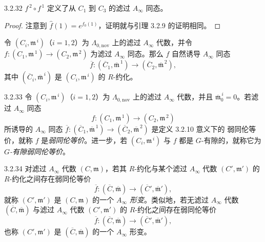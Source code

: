 \begin{lemma}{3.2.32}\label{lem:3-2-32}
$f^{\,2}\circ f^{\,1}$ 定义了从 $C_1$ 到 $C_3$ 的滤过
$A_\infty$ 同态。
\end{lemma}

\begin{proof}
注意到 $\widehat f(1)=e^{f_0(1)}$，证明就与引理 3.2.9 的证明相同。
\end{proof}

令 $(C_i,\mathfrak m^{\,i})$（$i=1,2$）为
$\Lambda_{0,\mathrm{nov}}$ 上的滤过 $A_\infty$ 代数，并令
$f\colon(C_1,\mathfrak m^{\,1})\to(C_2,\mathfrak m^{\,2})$ 为滤过
$A_\infty$ 同态。那么 $f$ 自然诱导 $A_\infty$ 同态
\[
  \overline f\colon
  (\overline C_1,\overline{\mathfrak m}^{\,1})
  \longrightarrow
  (\overline C_2,\overline{\mathfrak m}^{\,2}),
\]
其中 $(\overline C_i,\overline{\mathfrak m}^{\,i})$ 是
$(C_i,\mathfrak m^{\,i})$ 的 $R$-约化。

\begin{definition}{3.2.33}\label{def:3-2-33}
令 $(C_i,\mathfrak m^{\,i})$（$i=1,2$）为
$\Lambda_{0,\mathrm{nov}}$ 上的滤过 $A_\infty$ 代数，并且
$\overline{\mathfrak m}^{\,i}_0=0$。若滤过 $A_\infty$ 同态
\[
  f\colon(C_1,\mathfrak m^{\,1})
  \longrightarrow(C_2,\mathfrak m^{\,2})
\]
所诱导的 $A_\infty$ 同态
$\overline f\colon(\overline C_1,\overline{\mathfrak m}^{\,1})
\to(\overline C_2,\overline{\mathfrak m}^{\,2})$ 是定义 3.2.10 意义下的
弱同伦等价，就称 $f$ 是\emph{弱同伦等价}。进一步，若
$(C_i,\mathfrak m^{\,i})$ 与 $f$ 都是 $G$-有隙的，就称它为
\emph{$G$-有隙弱同伦等价}。
\end{definition}

\begin{definition}{3.2.34}\label{def:3-2-34}
对滤过 $A_\infty$ 代数 $(C,\mathfrak m)$，若其 $R$-约化与某个滤过
$A_\infty$ 代数 $(C',\mathfrak m')$ 的 $R$-约化之间存在弱同伦等价
\[
  \overline f\colon(\overline C,\overline{\mathfrak m})
  \longrightarrow(\overline C',\overline{\mathfrak m}'),
\]
就称 $(C',\mathfrak m')$ 是 $(C,\mathfrak m)$ 的一个
\emph{$A_\infty$ 形变}。类似地，若无滤过
$A_\infty$ 代数 $(\overline C,\overline{\mathfrak m})$ 与滤过
$A_\infty$ 代数 $(C',\mathfrak m')$ 的 $R$-约化之间存在弱同伦等价
\[
  \overline f\colon(\overline C,\overline{\mathfrak m})
  \longrightarrow(\overline C',\overline{\mathfrak m}'),
\]
也称 $(C',\mathfrak m')$ 是
$(\overline C,\overline{\mathfrak m})$ 的一个 $A_\infty$ 形变。
\end{definition}
